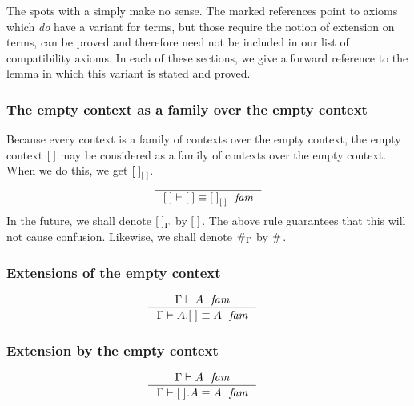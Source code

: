 The spots with a \xmark simply make no sense. The marked references point to
axioms which \emph{do} have a variant for terms, but those require the notion
of extension on terms, can be proved and therefore need not be included in our
list of compatibility axioms. In each of these sections, we give a forward
reference to the lemma in which this variant is stated and proved.

\subsubsection{The empty context as a family over the empty context}
\label{comp-00}
Because every context is a family of contexts over the empty context, 
the empty context $\emptyc$ may be considered as a family of contexts over the empty
context. When we do this, we get $\emptyf[\emptyc]$.
\begin{equation}\label{eq:comp-00}
\inference
  { }
  { \jfameq
      {\emptyc}
      {\emptyc}
      {\emptyf[\emptyc]}
    }
\end{equation}
In the future, we shall denote $\emptyf[\Gamma]$ by $\emptyf$. The above rule
guarantees that this will not cause confusion. Likewise, we shall denote
$\emptytm[\Gamma]$ by $\emptytm$.

\subsubsection{Extensions of the empty context}
\label{comp-e0}
\begin{align}
& \inference
  { \jfam{\Gamma}{A}
    }
  { \jfameq{\Gamma}{{A}{\emptyf}}{A}
    }
  \label{comp-e0-f}
\end{align}

\subsubsection{Extension by the empty context}
\label{comp-0e}
\begin{align}
& \inference
  { \jfam{\Gamma}{A}
    }
  { \jfameq{\Gamma}{\ctxext{\emptyf}{A}}{A}
    }
  \label{comp-0e-f}
\end{align}

